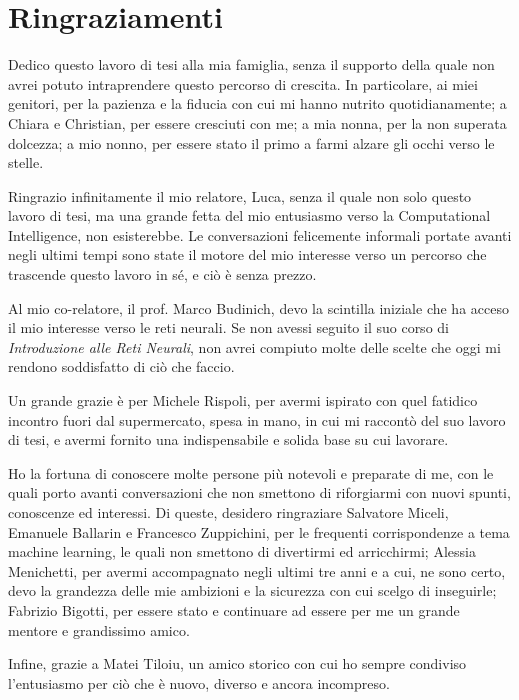 \documentclass[a4paper, twoside]{article}
\begin{document}
\newpage

\section*{Ringraziamenti}

Dedico questo lavoro di tesi alla mia famiglia, senza il supporto della quale non avrei potuto intraprendere questo percorso di crescita. In particolare, ai miei genitori, per la pazienza e la fiducia con cui mi hanno nutrito quotidianamente; a Chiara e Christian, per essere cresciuti con me; a mia nonna, per la non superata dolcezza; a mio nonno, per essere stato il primo a farmi alzare gli occhi verso le stelle.

Ringrazio infinitamente il mio relatore, Luca, senza il quale non solo questo lavoro di tesi, ma una grande fetta del mio entusiasmo verso la Computational Intelligence, non esisterebbe. Le conversazioni felicemente informali portate avanti negli ultimi tempi sono state il motore del mio interesse verso un percorso che trascende questo lavoro in sé, e ciò è senza prezzo.

Al mio co-relatore, il prof. Marco Budinich, devo la scintilla iniziale che ha acceso il mio interesse verso le reti neurali. Se non avessi seguito il suo corso di \textit{Introduzione alle Reti Neurali}, non avrei compiuto molte delle scelte che oggi mi rendono soddisfatto di ciò che faccio.

Un grande grazie è per Michele Rispoli, per avermi ispirato con quel fatidico incontro fuori dal supermercato, spesa in mano, in cui mi raccontò del suo lavoro di tesi, e avermi fornito una indispensabile e solida base su cui lavorare.

Ho la fortuna di conoscere molte persone più notevoli e preparate di me, con le quali porto avanti conversazioni che non smettono di riforgiarmi con nuovi spunti, conoscenze ed interessi. Di queste, desidero ringraziare Salvatore Miceli, Emanuele Ballarin e Francesco Zuppichini, per le frequenti corrispondenze a tema machine learning, le quali non smettono di divertirmi ed arricchirmi; Alessia Menichetti, per avermi accompagnato negli ultimi tre anni e a cui, ne sono certo, devo la grandezza delle mie ambizioni e la sicurezza con cui scelgo di inseguirle; Fabrizio Bigotti, per essere stato e continuare ad essere per me un grande mentore e grandissimo amico.

Infine, grazie a Matei Tiloiu, un amico storico con cui ho sempre condiviso l'entusiasmo per ciò che è nuovo, diverso e ancora incompreso.
\end{document}
